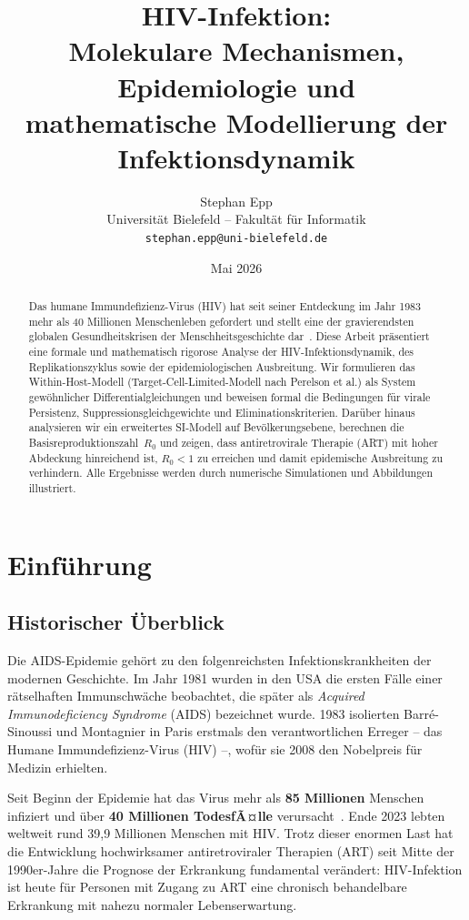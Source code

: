﻿\documentclass[a4paper,12pt]{article}
\title{\textbf{HIV-Infektion:}\\[0.4em]
\large Molekulare Mechanismen, Epidemiologie und\\
mathematische Modellierung der Infektionsdynamik}
\author{Stephan Epp\\
\small Universit\"at Bielefeld -- Fakult\"at f\"ur Informatik\\
\small \texttt{stephan.epp@uni-bielefeld.de}}
\date{Mai 2026}
\theoremstyle{definition}
\begin{document}
\maketitle

\begin{abstract}
Das humane Immundefizienz-Virus (HIV) hat seit seiner Entdeckung im Jahr 1983 mehr als 40 Millionen
Menschenleben gefordert und stellt eine der gravierendsten globalen Gesundheitskrisen der
Menschheitsgeschichte dar~\cite{bekker2023hiv}.
Diese Arbeit pr\"asentiert eine formale und mathematisch rigorose Analyse der HIV-Infektionsdynamik,
des Replikationszyklus sowie der epidemiologischen Ausbreitung.
Wir formulieren das Within-Host-Modell (Target-Cell-Limited-Modell nach Perelson et al.)
als System gew\"ohnlicher Differentialgleichungen und beweisen formal die Bedingungen
f\"ur virale Persistenz, Suppressionsgleichgewichte und Eliminationskriterien.
Dar\"uber hinaus analysieren wir ein erweitertes SI-Modell auf Bev\"olkerungsebene,
berechnen die Basisreproduktionszahl~$R_0$ und zeigen, dass antiretrovirale Therapie (ART)
mit hoher Abdeckung hinreichend ist, $R_0 < 1$ zu erreichen und damit epidemische Ausbreitung
zu verhindern. Alle Ergebnisse werden durch numerische Simulationen und Abbildungen illustriert.
\end{abstract}

\tableofcontents
\newpage

\section{Einf\"uhrung}

\subsection{Historischer \"Uberblick}

Die AIDS-Epidemie geh\"ort zu den folgenreichsten Infektionskrankheiten der modernen Geschichte.
Im Jahr 1981 wurden in den USA die ersten F\"alle einer r\"atselhaften Immunschw\"ache
beobachtet, die sp\"ater als \emph{Acquired Immunodeficiency Syndrome} (AIDS) bezeichnet wurde.
1983 isolierten Barr\'e-Sinoussi und Montagnier in Paris erstmals den verantwortlichen Erreger
-- das Humane Immundefizienz-Virus (HIV) --, wof\"ur sie 2008 den Nobelpreis f\"ur Medizin erhielten.

Seit Beginn der Epidemie hat das Virus mehr als \textbf{85 Millionen} Menschen infiziert und
\"uber \textbf{40 Millionen TodesfÃ¤lle} verursacht~\cite{bekker2023hiv}. Ende 2023 lebten
weltweit rund 39,9 Millionen Menschen mit HIV. Trotz dieser enormen Last hat die Entwicklung
hochwirksamer antiretroviraler Therapien (ART) seit Mitte der 1990er-Jahre die Prognose der
Erkrankung fundamental ver\"andert: HIV-Infektion ist heute f\"ur Personen mit Zugang zu ART
eine chronisch behandelbare Erkrankung mit nahezu normaler Lebenserwartung.
\end{document}
